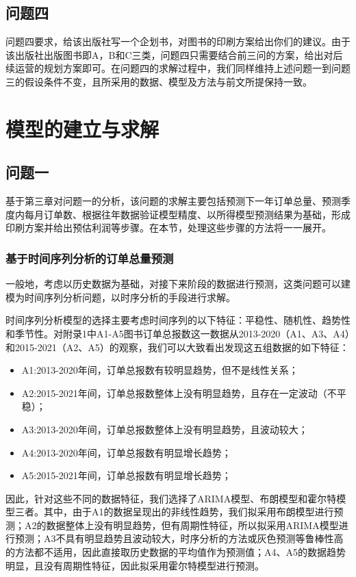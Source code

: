 \documentclass[bwprint]{gmcmthesis}
\begin{document}
\subsection{问题四}

问题四要求，给该出版社写一个企划书，对图书的印刷方案给出你们的建议。由于该出版社出版图书即A，B和C三类，问题四只需要结合前三问的方案，给出对后续运营的规划方案即可。在问题四的求解过程中，我们同样维持上述问题一到问题三的假设条件不变，且所采用的数据、模型及方法与前文所提保持一致。

\newpage

\section{模型的建立与求解}

\subsection{问题一}

基于第三章对问题一的分析，该问题的求解主要包括预测下一年订单总量、预测季度内每月订单数、根据往年数据验证模型精度、以所得模型预测结果为基础，形成印刷方案并给出预估利润等步骤。在本节，处理这些步骤的方法将一一展开。

\subsubsection{基于时间序列分析的订单总量预测}

一般地，考虑以历史数据为基础，对接下来阶段的数据进行预测，这类问题可以建模为时间序列分析问题，以时序分析的手段进行求解。

时间序列分析模型的选择主要考虑时间序列的以下特征：平稳性、随机性、趋势性和季节性。对附录1中A1-A5图书订单总报数这一数据从2013-2020（A1、A3、A4）和2015-2021（A2、A5）的观察，我们可以大致看出发现这五组数据的如下特征：
\begin{itemize}
  \item A1:2013-2020年间，订单总报数有较明显趋势，但不是线性关系；
  \item A2:2015-2021年间，订单总报数整体上没有明显趋势，且存在一定波动（不平稳）；
  \item A3:2013-2020年间，订单总报数整体上没有明显趋势，且波动较大；
  \item A4:2013-2020年间，订单总报数有明显增长趋势；
  \item A5:2015-2021年间，订单总报数有明显增长趋势；
\end{itemize}

因此，针对这些不同的数据特征，我们选择了ARIMA模型、布朗模型和霍尔特模型三者。其中，由于A1的数据呈现出的非线性趋势，我们拟采用布朗模型进行预测；A2的数据整体上没有明显趋势，但有周期性特征，所以拟采用ARIMA模型进行预测；A3不具有明显趋势且波动较大，时序分析的方法或灰色预测等鲁棒性高的方法都不适用，因此直接取历史数据的平均值作为预测值；A4、A5的数据趋势明显，且没有周期性特征，因此拟采用霍尔特模型进行预测。
\end{document}
